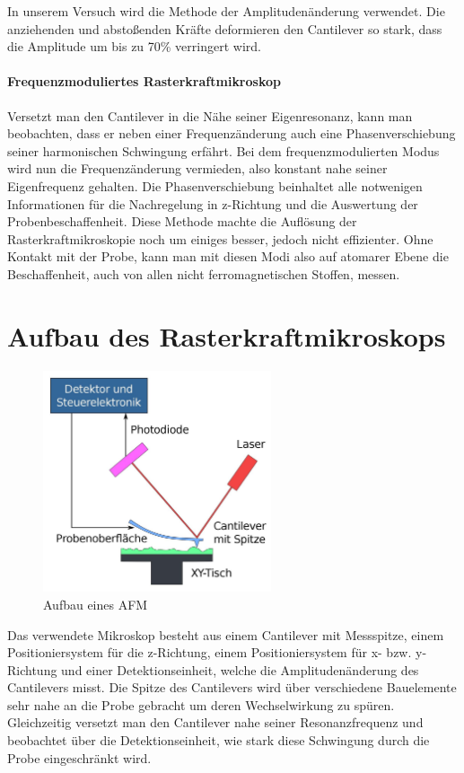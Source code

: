  In unserem Versuch wird die Methode der Amplitudenänderung verwendet. 
Die anziehenden und abstoßenden Kräfte deformieren den Cantilever so stark, dass die Amplitude um bis zu 70\% verringert wird.


       \paragraph{Frequenzmoduliertes Rasterkraftmikroskop}
       
Versetzt man den Cantilever in die Nähe seiner Eigenresonanz, kann man beobachten, dass er neben einer Frequenzänderung auch eine Phasenverschiebung seiner harmonischen Schwingung erfährt.
Bei dem frequenzmodulierten Modus wird nun die Frequenzänderung vermieden, also konstant nahe seiner Eigenfrequenz gehalten.
Die Phasenverschiebung beinhaltet alle notwenigen Informationen für die Nachregelung in z-Richtung und die Auswertung der Probenbeschaffenheit.
Diese Methode machte die Auflösung der Rasterkraftmikroskopie noch um einiges besser, jedoch nicht effizienter.
Ohne Kontakt mit der Probe, kann man mit diesen Modi also auf atomarer Ebene die Beschaffenheit, auch von allen nicht ferromagnetischen Stoffen, messen.
       
 \section{Aufbau des Rasterkraftmikroskops}
\begin{figure}[h!]
    \centering
    \includegraphics[width=0.6\textwidth]{Abb/afm.jpg}
    \caption{Aufbau eines AFM}
    \label{afm}
\end{figure}

Das verwendete Mikroskop besteht aus einem Cantilever mit Messspitze, einem Positioniersystem für die z-Richtung, einem Positioniersystem für x- bzw. y-Richtung und einer Detektionseinheit, welche die Amplitudenänderung des Cantilevers misst.  
Die Spitze des Cantilevers wird über verschiedene Bauelemente sehr nahe an die Probe gebracht um deren Wechselwirkung zu spüren.
Gleichzeitig versetzt man den Cantilever nahe seiner Resonanzfrequenz und beobachtet über die Detektionseinheit, wie stark diese Schwingung durch die Probe eingeschränkt wird.

